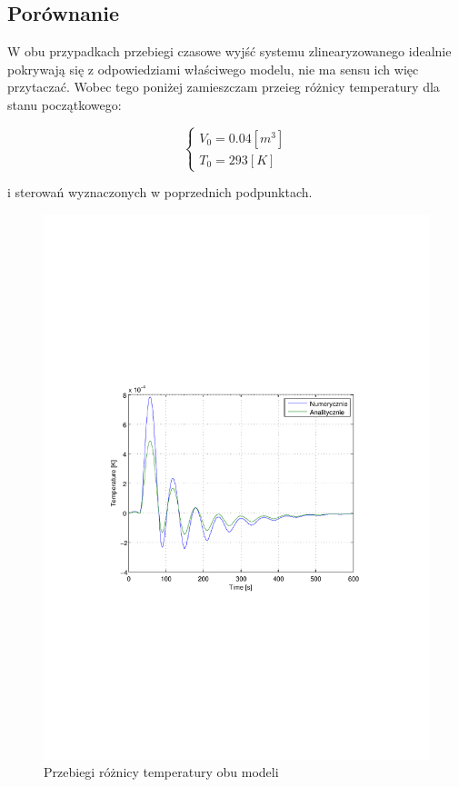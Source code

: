 \documentclass[12pt]{article}
\begin{document}
\newpage

\subsection{Porównanie}

W obu przypadkach przebiegi czasowe wyjść systemu zlinearyzowanego idealnie
pokrywają się z odpowiedziami właściwego modelu, nie ma sensu ich więc
przytaczać. Wobec tego poniżej zamieszczam przeieg różnicy temperatury dla
stanu początkowego:

\begin{equation*}
	\begin{cases}
		V_0=0.04[m^3]\\
		T_0=293[K]
	\end{cases}
\end{equation*}

i sterowań wyznaczonych w poprzednich podpunktach.

\begin{figure}[!htb]
	\begin{center}
		\includegraphics[width=12cm,trim=3cm 9cm 3cm 9cm,clip] 
		{../res/img/error12.pdf}
	\end{center}
	\caption{Przebiegi różnicy temperatury obu modeli}
\end{figure}
\end{document}
